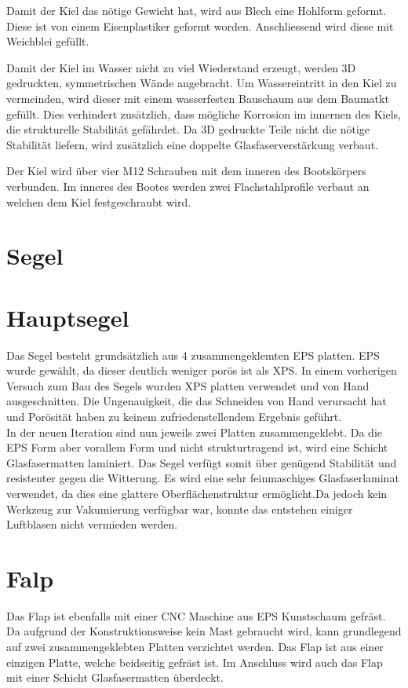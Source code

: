 Damit der Kiel das nötige Gewicht hat, wird aus Blech eine Hohlform geformt. Diese ist von einem Eisenplastiker geformt worden. Anschliessend wird diese mit Weichblei gefüllt. 

Damit der Kiel im Wasser nicht zu viel Wiederstand erzeugt, werden 3D gedruckten, symmetrischen Wände angebracht. Um Wassereintritt in den Kiel zu vermeinden, wird dieser mit einem wasserfesten Bauschaum aus dem Baumatkt gefüllt. Dies verhindert zusätzlich, dass mögliche Korrosion im innernen des Kiels, die strukturelle Stabilität gefährdet.
Da 3D gedruckte Teile nicht die nötige Stabilität liefern, wird zusätzlich eine doppelte Glasfaserverstärkung verbaut. 

Der Kiel wird über vier M12 Schrauben mit dem inneren des Bootskörpers verbunden. Im inneres des Bootes werden zwei Flachstahlprofile verbaut an welchen dem Kiel festgeschraubt wird. 





\section{Segel}

\section{Hauptsegel}
Das Segel besteht grundsätzlich aus 4 zusammengeklemten EPS platten. EPS wurde gewählt, da dieser deutlich weniger porös ist als XPS. In einem vorherigen Versuch zum Bau des Segels wurden XPS platten verwendet und von Hand ausgeschnitten. Die Ungenauigkeit, die das Schneiden von Hand verursacht hat und Porösität haben zu keinem zufriedenstellendem Ergebnis geführt.
\\
In der neuen Iteration sind nun jeweils zwei Platten zusammengeklebt. Da die EPS Form aber vorallem Form und nicht strukturtragend ist, wird eine Schicht Glasfasermatten laminiert. Das Segel verfügt somit über genügend Stabilität und resistenter gegen die Witterung.
Es wird eine sehr feinmaschiges Glasfaserlaminat verwendet, da dies eine glattere Oberflächenstruktur ermöglicht.Da jedoch kein Werkzeug zur Vakumierung verfügbar war, konnte das entstehen einiger Luftblasen nicht vermieden werden. 


\section{Falp}
Das Flap ist ebenfalls mit einer CNC Maschine aus EPS Kunstschaum gefräst. Da aufgrund der Konstruktionsweise kein Mast gebraucht wird, kann grundlegend auf zwei zusammengeklebten Platten verzichtet werden.
Das Flap ist aus einer einzigen Platte, welche beidseitig gefräst ist.
Im Anschluss wird auch das Flap mit einer Schicht Glasfasermatten überdeckt.




